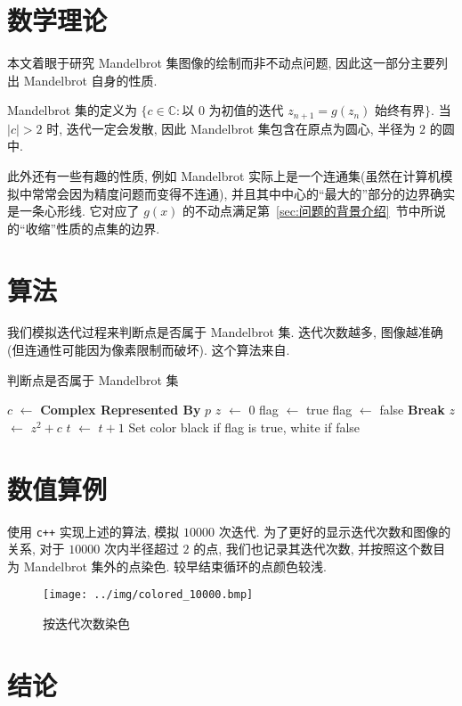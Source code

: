 \documentclass{ctexart}
\begin{document}
\section{数学理论} %
\label{sec:数学理论}
本文着眼于研究 Mandelbrot 集图像的绘制而非不动点问题, 因此这一部分主要列出 Mandelbrot 自身的性质\cite{wiki-Madelbrot_set}. \par
Mandelbrot 集的定义为 $\{c \in \mathbb{C}: \text{以 } 0 \text{ 为初值的迭代 }z_{n + 1} = g(z_n)\text{ 始终有界}\}$. 当 $\left|c\right| > 2$ 时, 迭代一定会发散, 因此 Mandelbrot 集包含在原点为圆心, 半径为 $2$ 的圆中. \par
此外还有一些有趣的性质, 例如 Mandelbrot 实际上是一个连通集(虽然在计算机模拟中常常会因为精度问题而变得不连通), 并且其中中心的``最大的''部分的边界确实是一条心形线. 它对应了 $g(x)$ 的不动点满足第~\ref{sec:问题的背景介绍}~节中所说的``收缩''性质的点集的边界\cite{tbob-Mandelbrot}.
\section{算法} %
\label{sec:算法}
我们模拟迭代过程来判断点是否属于 Mandelbrot 集. 迭代次数越多, 图像越准确(但连通性可能因为像素限制而破坏). 这个算法来自\cite{Arnaud_Cheritat-wiki-Madelbrot_set}.
\begin{algorithm}
\caption{判断点是否属于 Mandelbrot 集}
\label{algo::judge}
 {
	$c$ $\leftarrow$ \textbf{Complex Represented By} $p$\;
	$z$ $\leftarrow$ 0\;
	flag $\leftarrow$ true\;
	 {
		{
			flag $\leftarrow$ false\;
			\textbf{Break}\;
		}
		{
			$z$ $\leftarrow$ $z^2 + c$\;
			$t$ $\leftarrow$ $t + 1$\;
		}
	}
	Set color black if flag is true, white if false\;
}
\end{algorithm}
\section{数值算例} %
\label{sec:数值算例}
使用 \verb|c++| 实现上述的算法, 模拟 $10000$ 次迭代. 为了更好的显示迭代次数和图像的关系, 对于 $10000$ 次内半径超过 $2$ 的点, 我们也记录其迭代次数, 并按照这个数目为 Mandelbrot 集外的点染色. 较早结束循环的点颜色较浅.
\begin{figure}[H]
	\centering
	\texttt{[image: ../img/colored\_10000.bmp]}
	\caption{按迭代次数染色}
	\label{fig::colored}
\end{figure}
\section{结论} %
\label{sec:结论}


\end{document}

